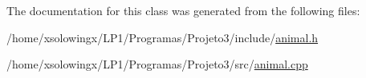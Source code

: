 The documentation for this class was generated from the following files\+:\begin{DoxyCompactItemize}
\item 
/home/xsolowingx/\+L\+P1/\+Programas/\+Projeto3/include/\hyperlink{animal_8h}{animal.\+h}\item 
/home/xsolowingx/\+L\+P1/\+Programas/\+Projeto3/src/\hyperlink{animal_8cpp}{animal.\+cpp}\end{DoxyCompactItemize}
